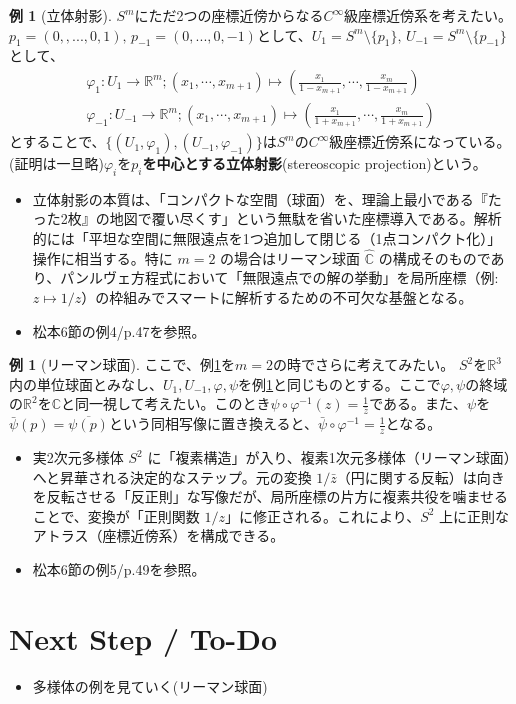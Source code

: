 \documentclass[paper=a4, fontsize=11pt]{jlreq} %
\theoremstyle{definition}
\newtheorem{example}[theorem]{例}
\begin{document}
\begin{example}[立体射影]\label{stereo_proj}
    $S^{m}$にただ2つの座標近傍からなる$C^{\infty}$級座標近傍系を考えたい。
    $p_{1}=(0,,...,0,1),\,p_{-1}=(0,...,0,-1)$として、$U_{1}=S^{m}\setminus\{p_{1}\},\,U_{-1}=S^{m}\setminus\{p_{-1}\}$として、
    \begin{gather*}
    \varphi_{1}:U_{1}\to\mathbb{R}^{m};(x_{1},\cdots,x_{m+1})\mapsto(\frac{x_{1}}{1-x_{m+1}},\cdots,\frac{x_{m}}{1-x_{m+1}})\\
    \varphi_{-1}:U_{-1}\to\mathbb{R}^{m};(x_{1},\cdots,x_{m+1})\mapsto(\frac{x_{1}}{1+x_{m+1}},\cdots,\frac{x_{m}}{1+x_{m+1}})
    \end{gather*}
    とすることで、$\{(U_{1},\varphi_{1}),(U_{-1},\varphi_{-1})\}$は$S^{m}$の$C^{\infty}$級座標近傍系になっている。(証明は一旦略)$\varphi_{i}$を\textbf{$p_{i}$を中心とする立体射影}(stereoscopic projection)という。
    \begin{itemize}
        \item[\textbf{Insight:}] 立体射影の本質は、「コンパクトな空間（球面）を、理論上最小である『たった2枚』の地図で覆い尽くす」という無駄を省いた座標導入である。解析的には「平坦な空間に無限遠点を1つ追加して閉じる（1点コンパクト化）」操作に相当する。特に $m=2$ の場合はリーマン球面 $\hat{\mathbb{C}}$ の構成そのものであり、パンルヴェ方程式において「無限遠点での解の挙動」を局所座標（例: $z \mapsto 1/z$）の枠組みでスマートに解析するための不可欠な基盤となる。
        \item[\textbf{Link:}] 松本6節の例4/p.47を参照。
    \end{itemize}
\end{example}

\begin{example}[リーマン球面]
    ここで、例\ref{stereo_proj}を$m=2$の時でさらに考えてみたい。
    $S^{2}$を$\mathbb{R}^{3}$内の単位球面とみなし、$U_{1},U_{-1},\varphi,\psi$を例\ref{stereo_proj}と同じものとする。ここで$\varphi,\psi$の終域の$\mathbb{R}^{2}$を$\mathbb{C}$と同一視して考えたい。このとき$\psi\circ\varphi^{-1}(z)=\frac{1}{\bar{z}}$である。また、$\psi$を$\bar{\psi}(p)=\overline{\psi(p)}$という同相写像に置き換えると、$\bar{\psi}\circ\varphi^{-1}=\frac{1}{z}$となる。
    \begin{itemize}
        \item[\textbf{Insight:}] 実2次元多様体 $S^2$ に「複素構造」が入り、複素1次元多様体（リーマン球面）へと昇華される決定的なステップ。元の変換 $1/\bar{z}$（円に関する反転）は向きを反転させる「反正則」な写像だが、局所座標の片方に複素共役を噛ませることで、変換が「正則関数 $1/z$」に修正される。これにより、$S^2$ 上に正則なアトラス（座標近傍系）を構成できる。
        \item[\textbf{Link:}] 松本6節の例5/p.49を参照。
    \end{itemize}
\end{example}

\section{Next Step / To-Do}
\begin{itemize}
    \item [ ] 多様体の例を見ていく(リーマン球面)
\end{itemize}
\end{document}
